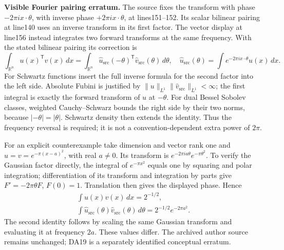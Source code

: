 \documentclass[
  11pt,
]{article}
\begin{document}
\textbf{Visible Fourier pairing erratum.} The source fixes the transform
with phase \(-2\pi i x\cdot\theta\), with inverse phase
\(+2\pi i x\cdot\theta\), at lines151--152. Its scalar bilinear pairing
at line140 uses an inverse transform in its first factor. The vector
display at line156 instead integrates two forward transforms at the same
frequency. With the stated bilinear pairing its correction is \[
 \int_{\mathbb R^n}u(x)^{\mathsf T}v(x)\,dx
 =\int_{\mathbb R^n}\widehat u_{\mathrm{src}}(-\theta)^{\mathsf T}
                          \widehat v_{\mathrm{src}}(\theta)\,d\theta,
 \quad
 \widehat u_{\mathrm{src}}(\theta)=\int e^{-2\pi i x\cdot\theta}u(x)\,dx.
 \tag{DA19}
\] For Schwartz functions insert the full inverse formula for the second
factor into the left side. Absolute Fubini is justified by
\(\|u\|_{L^1}\|\widehat v_{\mathrm{src}}\|_{L^1}<\infty\); the first
integral is exactly the forward transform of \(u\) at \(-\theta\). For
dual Bessel Sobolev classes, weighted Cauchy--Schwarz bounds the right
side by their two norms, because \(|-\theta|=|\theta|\). Schwartz
density then extends the identity. Thus the frequency reversal is
required; it is not a convention-dependent extra power of \(2\pi\).

For an explicit counterexample take dimension and vector rank one and
\(u=v=e^{-\pi(x-a)^2}\), with real \(a\ne0\). Its transform is
\(e^{-2\pi ia\theta}e^{-\pi\theta^2}\). To verify the Gaussian factor
directly, the integral of \(e^{-\pi x^2}\) equals one by squaring and
polar integration; differentiation of its transform and integration by
parts give \(F'=-2\pi\theta F\), \(F(0)=1\). Translation then gives the
displayed phase. Hence \[
 \begin{gathered}
 \int u(x)v(x)\,dx=2^{-1/2},\\
 \int\widehat u_{\mathrm{src}}(\theta)\widehat v_{\mathrm{src}}(\theta)\,d\theta
       =2^{-1/2}e^{-2\pi a^2}.
 \end{gathered}\tag{DA20}
\] The second identity follows by scaling the same Gaussian transform
and evaluating it at frequency \(2a\). These values differ. The archived
author source remains unchanged; DA19 is a separately identified
conceptual erratum.
\end{document}
